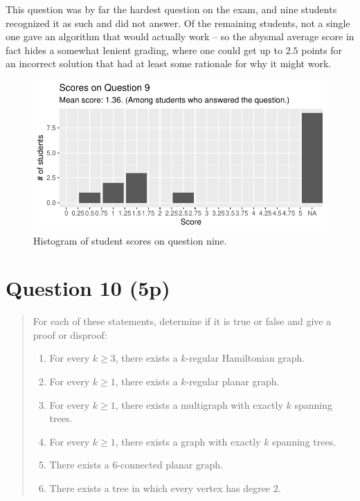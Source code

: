 \documentclass[nobib]{tufte-handout}
\begin{document}
This question was by far the hardest question on the exam, and nine students recognized it as such and did not answer. Of the remaining students, not a single one gave an algorithm that would actually work -- so the abysmal average score in fact hides a somewhat lenient grading, where one could get up to $2.5$ points for an incorrect solution that had at least some rationale for why it might work.

\begin{figure}[p]
  \centering
  \includegraphics[width = \textwidth]{Q9.pdf}
  \caption[Score histogram for Q9]{Histogram of student scores on question nine.}
  \label{fig:Q9}
\end{figure}

\section{Question 10 (5p)} %

\begin{quotation}
  For each of these statements, determine if it is true or false and give a proof or disproof:
  \begin{enumerate}[label=\alph*)]
    \item For every $k\geq 3$, there exists a $k$-regular Hamiltonian graph.
    \item For every $k \geq 1$, there exists a $k$-regular planar graph.
    \item For every $k \geq 1$, there exists a multigraph with exactly $k$ spanning trees.
    \item For every $k \geq 1$, there exists a graph with exactly $k$ spanning trees.
    \item There exists a $6$-connected planar graph.
    \item There exists a tree in which every vertex has degree $2$.
  \end{enumerate}
\end{quotation}
\end{document}
